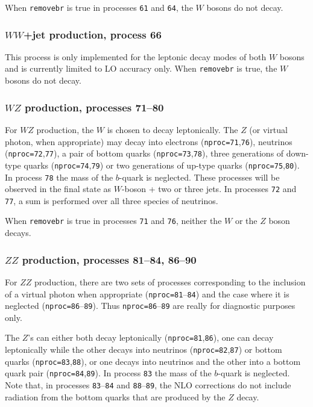 \documentclass[12pt]{article}
\begin{document}
When {\tt removebr} is true in processes {\tt 61} and {\tt 64},
the $W$ bosons do not decay.

\subsubsection{$WW$+jet production, process 66}

This process is only implemented for the leptonic decay modes of both $W$
bosons and is currently limited to LO accuracy only. When {\tt removebr} is true,
the $W$ bosons do not decay.

\subsubsection{$WZ$ production, processes 71--80}

For $WZ$ production, the $W$ is chosen to decay leptonically. The $Z$ (or
virtual photon, when appropriate) may decay into electrons
({\tt nproc=71},{\tt 76}), neutrinos ({\tt nproc=72},{\tt 77}), a
pair of bottom quarks ({\tt nproc=73},{\tt 78}), three generations of down-type
quarks ({\tt nproc=74},{\tt 79}) or two generations of up-type quarks ({\tt nproc=75},{\tt 80}).
In process {\tt 78} the mass of the $b$-quark is neglected.
These processes will be observed
in the final state as $W$-boson + two or three jets.
In processes {\tt 72} and {\tt 77}, a sum is performed over all three species of neutrinos.

When {\tt removebr} is true in processes {\tt 71} and {\tt 76},
neither the $W$ or the $Z$ boson decays.

\subsubsection{$ZZ$ production, processes 81--84, 86--90}

For $ZZ$ production, there are two sets of processes corresponding to the
inclusion of a virtual photon when appropriate ({\tt nproc=81}--{\tt 84})
and the case where it is neglected ({\tt nproc=86}--{\tt 89}).
Thus {\tt nproc=86}--{\tt 89} are really for diagnostic purposes only.

The $Z$'s can either both decay leptonically ({\tt nproc=81},{\tt 86}),
one can decay leptonically while the other decays into neutrinos
({\tt nproc=82},{\tt 87}) or bottom quarks ({\tt nproc=83},{\tt 88}), or
one decays into neutrinos and the other into a bottom quark pair
({\tt nproc=84},{\tt 89}).
In process {\tt 83} the mass of the $b$-quark is neglected. Note that, in processes
{\tt 83}--{\tt 84} and {\tt 88}--{\tt 89}, the NLO corrections do not include
radiation from the bottom quarks that are produced by the $Z$ decay.
\end{document}
